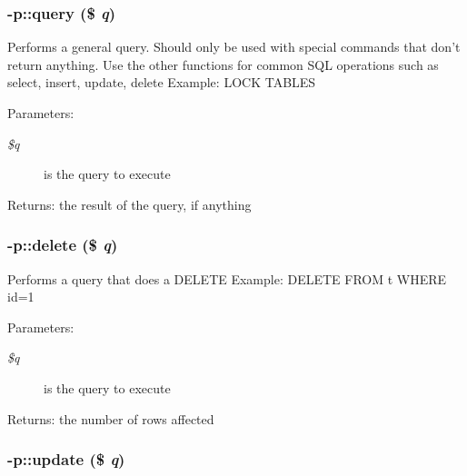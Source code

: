 \subsubsection{-p::query (\$ {\em q})\hspace{0.3cm}{\tt  [abstract]}}\label{protocolDB__Base-p_e7064a7ce0b258d4145972e8545361ca}


Performs a general query. Should only be used with special commands that don't return anything. Use the other functions for common SQL operations such as select, insert, update, delete Example: LOCK TABLES \begin{Desc}
\item[Parameters:]
\begin{description}
\item[{\em \$q}]is the query to execute \end{description}
\end{Desc}
\begin{Desc}
\item[Returns:]the result of the query, if anything \end{Desc}
\subsubsection{-p::delete (\$ {\em q})\hspace{0.3cm}{\tt  [abstract]}}\label{protocolDB__Base-p_be325d11ff1dba930f7417aab13aee29}


Performs a query that does a DELETE Example: DELETE FROM t WHERE id=1 \begin{Desc}
\item[Parameters:]
\begin{description}
\item[{\em \$q}]is the query to execute \end{description}
\end{Desc}
\begin{Desc}
\item[Returns:]the number of rows affected \end{Desc}
\subsubsection{-p::update (\$ {\em q})}\label{protocolDB__Base-p_68bdb2a90591b8564dc88613007d72de}


